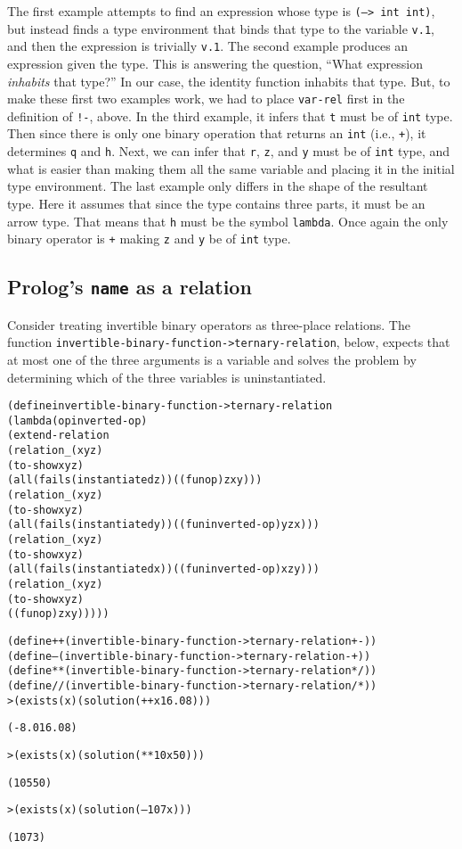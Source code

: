 The first example attempts to find an expression whose type is
\texttt{(--> int int)}, but instead finds a type environment that
binds that type to the variable \texttt{v.1}, and then the expression is
trivially \texttt{v.1}.  The second example produces an expression
given the type.  This is answering the question, ``What expression
\emph{inhabits} that type?''  In our case, the identity function
inhabits that type.  But, to make these first two examples work, we
had to place \texttt{var-rel} first in the definition of
\texttt{!-}, above.  In the third example, it infers that \texttt{t}
must be of \texttt{int} type.  Then since there is only one binary
operation that returns an \texttt{int} (i.e., \texttt{+}), it
determines \texttt{q} and \texttt{h}.  Next, we can infer that \texttt{r},
\texttt{z}, and \texttt{y} must be of \texttt{int} type, and what is
easier than making them all the same variable and placing it in the
initial type environment.  The last example only differs in the shape
of the resultant type.  Here it assumes that since the type contains
three parts, it must be an arrow type.  That means that \texttt{h}
must be the symbol \texttt{lambda}. Once again the only binary
operator is \texttt{+} making \texttt{z} and \texttt{y} be of
\texttt{int} type.

\subsection{Prolog's \texttt{name} as a relation}

Consider treating invertible binary operators as three-place
relations. The function
\texttt{invertible-binary-function->ternary-relation}, below, expects
that at most one of the three arguments is a variable and solves the
problem by determining which of the three variables is uninstantiated.

\begin{alltt}
(define invertible-binary-function->ternary-relation
  (lambda (op inverted-op)
    (extend-relation
      (relation _ (x y z)
        (to-show x y z)
        (all (fails (instantiated z)) ((fun op) z x y)))
      (relation _ (x y z)
        (to-show x y z)
        (all (fails (instantiated y)) ((fun inverted-op) y z x)))
      (relation _ (x y z)
        (to-show x y z)
        (all (fails (instantiated x)) ((fun inverted-op) x z y)))
      (relation _ (x y z)
        (to-show x y z)
        ((fun op) z x y)))))

(define ++ (invertible-binary-function->ternary-relation + -))
(define -- (invertible-binary-function->ternary-relation - +))
(define ** (invertible-binary-function->ternary-relation * /))
(define // (invertible-binary-function->ternary-relation / *))
\newpage
> (exists (x) (solution (++ x 16.0 8)))

(-8.0 16.0 8)

> (exists (x) (solution (** 10 x 50)))

(10 5 50)

> (exists (x) (solution (-- 10 7 x)))

(10 7 3)
\end{alltt}

